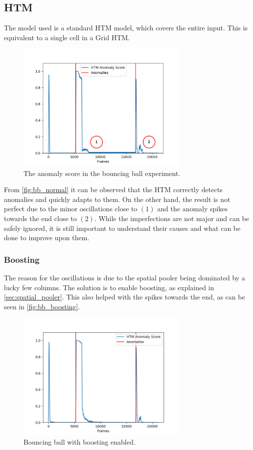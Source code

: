 \subsection{HTM}
The model used is a standard HTM model, which covers the entire input. This is equivalent to a single cell in a Grid HTM.
\begin{figure}[H]
    \centering
    \includegraphics[width=0.75\textwidth]{resources/experiments/bouncing_ball/bb_anoms_bad.png}
    \caption{The anomaly score in the bouncing ball experiment.}
    \label{fig:bb_normal}
\end{figure}
From \autoref{fig:bb_normal} it can be observed that the HTM correctly detects anomalies and quickly adapts to them. On the other hand, the result is not perfect due to the minor oscillations close to $(1)$ and the anomaly spikes towards the end close to $(2)$. While the imperfections are not major and can be safely ignored, it is still important to understand their causes and what can be done to improve upon them. \par
\subsubsection{Boosting}
The reason for the oscillations is due to the spatial pooler being dominated by a lucky few columns. The solution is to enable boosting, as explained in \autoref{sec:spatial_pooler}. This also helped with the spikes towards the end, as can be seen in \autoref{fig:bb_boosting}.\par
\begin{figure}[H]
    \centering
    \includegraphics[width=0.75\textwidth]{resources/experiments/bouncing_ball/bb_anoms_boosting.png}
    \caption{Bouncing ball with boosting enabled.}
    \label{fig:bb_boosting}
\end{figure}
